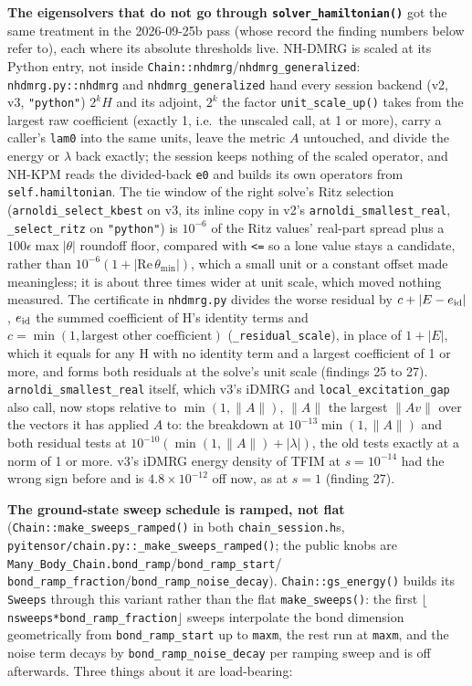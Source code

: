 \documentclass[11pt]{article}
\begin{document}
\textbf{The eigensolvers that do not go through
\texttt{solver\_hamiltonian()}} got the same treatment in the 2026-09-25b
pass (whose record the finding numbers below refer to), each where its
absolute thresholds live. NH-DMRG is scaled at its Python entry, not
inside \texttt{Chain::nhdmrg}/\texttt{nhdmrg\_generalized}:
\texttt{nhdmrg.py::nhdmrg} and \texttt{nhdmrg\_generalized} hand every
session backend (v2, v3, \texttt{"python"}) $2^kH$ and its adjoint, $2^k$
the factor \texttt{unit\_scale\_up()} takes from the largest raw
coefficient (exactly 1, i.e.\ the unscaled call, at 1 or more), carry a
caller's \texttt{lam0} into the same units, leave the metric $A$
untouched, and divide the energy or $\lambda$ back exactly; the session
keeps nothing of the scaled operator, and NH-KPM reads the divided-back
\texttt{e0} and builds its own operators from \texttt{self.hamiltonian}.
The tie window of the right solve's Ritz selection
(\texttt{arnoldi\_select\_kbest} on v3, its inline copy in v2's
\texttt{arnoldi\_smallest\_real}, \texttt{\_select\_ritz} on
\texttt{"python"}) is $10^{-6}$ of the Ritz values' real-part spread plus
a $100\epsilon\max|\theta|$ roundoff floor, compared with
\texttt{<=} so a lone value stays a candidate, rather than
$10^{-6}(1+|\mathrm{Re}\,\theta_{\min}|)$, which a small unit or a
constant offset made meaningless; it is about three times wider at unit
scale, which moved nothing measured. The certificate in
\texttt{nhdmrg.py} divides the worse residual by $c+|E-e_{\rm id}|$,
$e_{\rm id}$ the summed coefficient of H's identity terms and
$c=\min(1,\text{largest other coefficient})$ (\texttt{\_residual\_scale}),
in place of $1+|E|$, which it equals for any H with no identity term and a
largest coefficient of 1 or more, and forms both residuals at the solve's
unit scale (findings 25 to 27). \texttt{arnoldi\_smallest\_real} itself,
which v3's iDMRG and \texttt{local\_excitation\_gap} also call, now stops
relative to $\min(1,\lVert A\rVert)$, $\lVert A\rVert$ the largest
$\lVert Av\rVert$ over the vectors it has applied $A$ to: the breakdown at
$10^{-13}\min(1,\lVert A\rVert)$ and both residual tests at
$10^{-10}(\min(1,\lVert A\rVert)+|\lambda|)$, the old tests exactly at a
norm of 1 or more. v3's iDMRG energy density of TFIM at $s=10^{-14}$ had
the wrong sign before and is $4.8\times10^{-12}$ off now, as at $s=1$
(finding 27).

\textbf{The ground-state sweep schedule is ramped, not flat}
(\texttt{Chain::make\_sweeps\_ramped()} in both
\texttt{chain\_session.h}s,
\texttt{pyitensor/chain.py::\_make\_sweeps\_ramped()}; the public knobs
are \texttt{Many\_Body\_Chain.bond\_ramp}/\texttt{bond\_ramp\_start}/
\texttt{bond\_ramp\_fraction}/\texttt{bond\_ramp\_noise\_decay}).
\texttt{Chain::gs\_energy()} builds its \texttt{Sweeps} through this
variant rather than the flat \texttt{make\_sweeps()}: the first
$\lfloor$\texttt{nsweeps*bond\_ramp\_fraction}$\rfloor$ sweeps
interpolate the bond dimension geometrically from
\texttt{bond\_ramp\_start} up to \texttt{maxm}, the rest run at
\texttt{maxm}, and the noise term decays by
\texttt{bond\_ramp\_noise\_decay} per ramping sweep and is off
afterwards. Three things about it are load-bearing:
\end{document}
